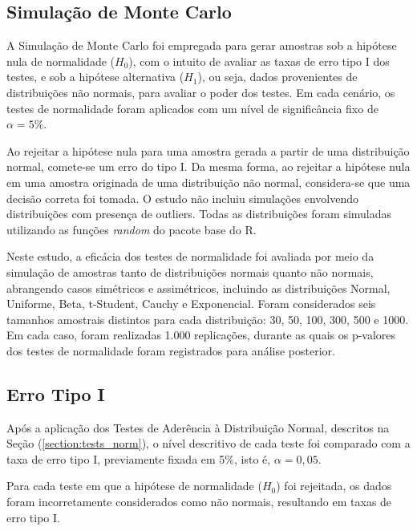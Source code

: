 \documentclass[a4paper,11pt]{article} %
\begin{document}
\subsection{Simulação de Monte Carlo} %

A Simulação de Monte Carlo foi empregada para gerar amostras sob a hipótese nula de normalidade ($H_0$), com o intuito de avaliar as taxas de erro tipo I dos testes, e sob a hipótese alternativa ($H_1$), ou seja, dados provenientes de distribuições não normais, para avaliar o poder dos testes. Em cada cenário, os testes de normalidade foram aplicados com um nível de significância fixo de $\alpha = 5\%$.

\vskip0.3cm

Ao rejeitar a hipótese nula para uma amostra gerada a partir de uma distribuição normal, comete-se um erro do tipo I. Da mesma forma, ao rejeitar a hipótese nula em uma amostra originada de uma distribuição não normal, considera-se que uma decisão correta foi tomada. O estudo não incluiu simulações envolvendo distribuições com presença de outliers. Todas as distribuições foram simuladas utilizando as funções \textit{random} do pacote base do R.

\vskip0.3cm

Neste estudo, a eficácia dos testes de normalidade foi avaliada por meio da simulação de amostras tanto de distribuições normais quanto não normais, abrangendo casos simétricos e assimétricos, incluindo as distribuições Normal, Uniforme, Beta, t-Student, Cauchy e Exponencial. Foram considerados seis tamanhos amostrais distintos para cada distribuição: 30, 50, 100, 300, 500 e 1000. Em cada caso, foram realizadas 1.000 replicações, durante as quais os p-valores dos testes de normalidade foram registrados para análise posterior.

\subsection{Erro Tipo I} %

Após a aplicação dos Testes de Aderência à Distribuição Normal, descritos na Seção (\ref{section:tests_norm}), o nível descritivo de cada teste foi comparado com a taxa de erro tipo I, previamente fixada em 5\%, isto é, $\alpha = 0,05$.

\vskip0.3cm

Para cada teste em que a hipótese de normalidade ($H_0$) foi rejeitada, os dados foram incorretamente considerados como não normais, resultando em taxas de erro tipo I.
\end{document}
